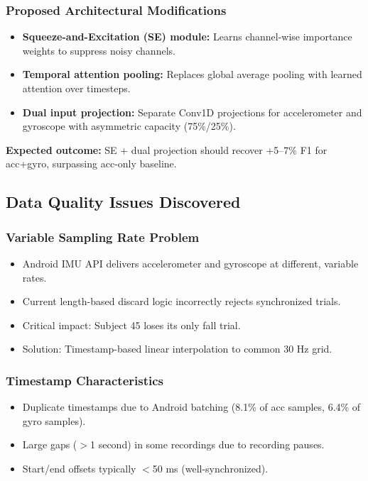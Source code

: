 \subsubsection{Proposed Architectural Modifications}

\begin{itemize}
    \item \textbf{Squeeze-and-Excitation (SE) module:} Learns channel-wise importance weights to suppress noisy channels.
    \item \textbf{Temporal attention pooling:} Replaces global average pooling with learned attention over timesteps.
    \item \textbf{Dual input projection:} Separate Conv1D projections for accelerometer and gyroscope with asymmetric capacity (75\%/25\%).
\end{itemize}

\textbf{Expected outcome:} SE + dual projection should recover +5--7\% F1 for acc+gyro, surpassing acc-only baseline.

\subsection{Data Quality Issues Discovered}

\subsubsection{Variable Sampling Rate Problem}

\begin{itemize}
    \item Android IMU API delivers accelerometer and gyroscope at different, variable rates.
    \item Current length-based discard logic incorrectly rejects synchronized trials.
    \item Critical impact: Subject 45 loses its only fall trial.
    \item Solution: Timestamp-based linear interpolation to common 30 Hz grid.
\end{itemize}

\subsubsection{Timestamp Characteristics}

\begin{itemize}
    \item Duplicate timestamps due to Android batching (8.1\% of acc samples, 6.4\% of gyro samples).
    \item Large gaps ($>$1 second) in some recordings due to recording pauses.
    \item Start/end offsets typically $<$50 ms (well-synchronized).
\end{itemize}

